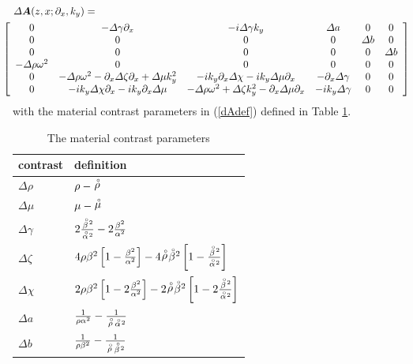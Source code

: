 \begin{eqnarray} \label{dAdef}
\lefteqn{
{{\mit \Delta} {\bmi A}}(z,x;{\partial }_{x},{k}_{y})
=}\\
&&\!\!\!\!\!\!\!\!\!\!\!\!
\left[{\begin{array}{cccccc}
0&- {{\mit \Delta} \gamma} {\partial }_{  x}&  -i {{\mit \Delta} \gamma} {  k}_{  y}&  
{{\mit \Delta} a}&0&0\\0&0&0&0&{{\mit \Delta} b}&0\\ 0&0&0&0&0&{{\mit \Delta} b}\\ - {{\mit \Delta} \rho} {\omega }^{  
2}&  0&0&0&0&0\\ 0&- {{\mit \Delta} \rho} {\omega 
}^{  2}  -{ \partial }_{x} {{\mit \Delta} \zeta} {\partial }_{  
x}  + {{\mit \Delta} \mu} {  k}_{  y}^{  2}&  
-i{k}_{y}{ \partial }_{x} {{\mit \Delta} \chi}   -i{k}_{y} {{\mit \Delta} \mu} {\partial 
}_{  x}&  -{ \partial }_{x} {{\mit \Delta} \gamma} &  0&0\\ 
0&-i{k}_{y} {{\mit \Delta} \chi} {\partial }_{  x}  -i{k}_{y}{ \partial 
}_{x} {{\mit \Delta} \mu} &  - {{\mit \Delta} \rho} {\omega }^{  2}  + {{\mit \Delta} \zeta }
{  k}_{  y}^{  2}  -{ \partial }_{x} {{\mit \Delta} \mu} 
{\partial }_{  x}&  -i{k}_{y} {{\mit \Delta} \gamma} &  0&0\end{array}}\right]\nonumber
\end{eqnarray}
with the material contrast parameters in (\ref{dAdef}) defined in Table \ref{contrastTable}.

\begin{table}
\begin{tabular*}{100mm}{ll}\hline
contrast & definition\\ \hline
 $ \Delta \rho$ & $\rho - {\stackrel{\scriptscriptstyle _{\,\,\circ}}{ \rho}}$\\
 $ \Delta \mu$ & $\mu - {\stackrel{\scriptscriptstyle _{\,\,\circ}}{ \mu}}$\\
 $ \Delta \gamma$ & $2{\frac{{ \stackrel{\scriptscriptstyle _{\,\,\circ}}{ \beta} }{}^{2}}{{ \stackrel{\scriptscriptstyle _{\,\,\circ}}{ \alpha} }{}^{2}}}-
 2{\frac{{\beta}^{2}}{{\alpha}^{2}}}$\\
$\Delta \zeta$ &$4 \rho{\beta 
}^{2}\left[{1-{\frac{{\beta  }^{2}}{{\alpha}^{2}}}}\right]-4{\stackrel{\scriptscriptstyle _{\,\,\circ}}{ \rho}} 
{\stackrel{\scriptscriptstyle _{\,\,\circ}}{ \beta} }{}^{  2}\left[{ 
 1-{\frac{{ \stackrel{\scriptscriptstyle _{\,\,\circ}}{ \beta} }{}^{2}}{{\stackrel{\scriptscriptstyle _{\,\,\circ}}{ \alpha} }{}^{2}}}}\right]$\\
$\Delta \chi$ &$2 \rho {\beta}^{2}\left[{1-2{\frac{{ \beta  
}^{2}}{{\alpha}^{2}}}}\right]-2{\stackrel{\scriptscriptstyle _{\,\,\circ}}{ \rho}} {\stackrel{\scriptscriptstyle _{\,\,\circ}}{ \beta} }{}^{  2}\left[{ 
 1-2{\frac{{\stackrel{\scriptscriptstyle _{\,\,\circ}}{ \beta} }{}^{2}}{{\stackrel{\scriptscriptstyle _{\,\,\circ}}{ \alpha} }{}^{2}}}}\right]$\\
$\Delta  a$ & ${\frac{1}{\rho{\alpha}^{2}}}-
 {\frac{1}{ {\stackrel{\scriptscriptstyle _{\,\,\circ}}{ \rho}} {{\stackrel{\scriptscriptstyle _{\,\,\circ}}{ \alpha}} }{}^{  2}}}$\\ 
$\Delta  b$ & ${\frac{1}{\rho{\beta}^{2}}}-
 {\frac{1}{ {\stackrel{\scriptscriptstyle _{\,\,\circ}}{ \rho}} {{\stackrel{\scriptscriptstyle _{\,\,\circ}}{ \beta}} }{}^{  2}}}$\\  
 \hline
\end{tabular*}
\caption{\label{contrastTable} { The material contrast parameters}}
\end{table} 


